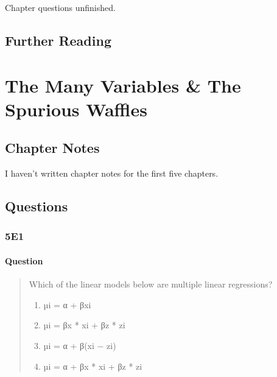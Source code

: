 \documentclass[
]{book}
\begin{document}
Chapter questions unfinished.

\hypertarget{further-reading-3}{%
\section*{Further Reading}\label{further-reading-3}}

\hypertarget{many_variables}{%
\chapter{The Many Variables \& The Spurious Waffles}\label{many_variables}}

\hypertarget{chapter-notes-4}{%
\section{Chapter Notes}\label{chapter-notes-4}}

I haven't written chapter notes for the first five chapters.

\hypertarget{questions-4}{%
\section{Questions}\label{questions-4}}

\hypertarget{e1-3}{%
\subsection*{5E1}\label{e1-3}}

\hypertarget{question-45}{%
\subsubsection*{Question}\label{question-45}}

\begin{quote}
Which of the linear models below are multiple linear regressions?

\begin{enumerate}
\def\labelenumi{(\arabic{enumi})}
\item
  µi = α + βxi
\item
  µi = βx * xi + βz * zi
\item
  µi = α + β(xi − zi)
\item
  µi = α + βx * xi + βz * zi
\end{enumerate}
\end{quote}
\end{document}
